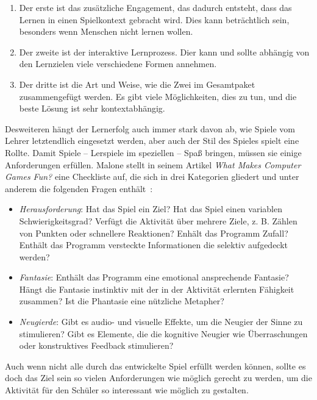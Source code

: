 \begin{enumerate}
    \item Der erste ist das zusätzliche Engagement, das dadurch entsteht, dass das Lernen in einen Spielkontext gebracht wird. Dies kann beträchtlich sein, besonders wenn Menschen nicht lernen wollen.
    \item Der zweite ist der interaktive Lernprozess. Dier kann und sollte abhängig von den Lernzielen viele verschiedene Formen annehmen.
    \item Der dritte ist die Art und Weise, wie die Zwei im Gesamtpaket zusammengefügt werden. Es gibt viele Möglichkeiten, dies zu tun, und die beste Lösung ist sehr kontextabhängig.
\end{enumerate}

Desweiteren hängt der Lernerfolg auch immer stark davon ab, wie Spiele vom Lehrer letztendlich eingesetzt werden, aber auch der Stil des Spieles spielt eine Rollte. Damit Spiele -- Lerspiele im speziellen -- Spaß bringen, müssen sie einige Anforderungen erfüllen. Malone stellt in seinem Artikel \textit{What Makes Computer Games Fun?} eine Checkliste auf, die sich in drei Kategorien gliedert und unter anderem die folgenden Fragen enthält~\cite[49]{malone1981}:

\begin{itemize}
    \item \emph{Herausforderung}: Hat das Spiel ein Ziel? Hat das Spiel einen variablen Schwierigkeitsgrad? Verfügt die Aktivität über mehrere Ziele, z. B. Zählen von Punkten oder schnellere Reaktionen? Enhält das Programm Zufall? Enthält das Programm versteckte Informationen die selektiv aufgedeckt werden?
    \item \emph{Fantasie}: Enthält das Programm eine emotional ansprechende Fantasie? Hängt die Fantasie instinktiv mit der in der Aktivität erlernten Fähigkeit zusammen? Ist die Phantasie eine nützliche Metapher?
    \item \emph{Neugierde}: Gibt es audio- und visuelle Effekte, um die Neugier der Sinne zu stimulieren? Gibt es Elemente, die die kognitive Neugier wie Überraschungen oder konstruktives Feedback stimulieren?
\end{itemize}

Auch wenn nicht alle durch das entwickelte Spiel erfüllt werden können, sollte es doch das Ziel sein so vielen Anforderungen wie möglich gerecht zu werden, um die Aktivität für den Schüler so interessant wie möglich zu gestalten.


